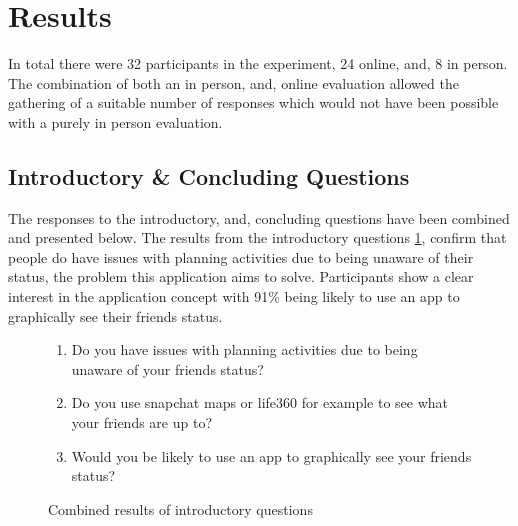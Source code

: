 \section{Results}
In total there were 32 participants in the experiment, 24 online, and, 8 in person. The combination of both an in person, and, online evaluation allowed the gathering of a suitable number of responses which would not have been possible with a purely in person evaluation.

\subsection{Introductory \& Concluding Questions}
The responses to the introductory, and, concluding questions have been combined and presented below. The results from the introductory questions \ref{fig:introAns}, confirm that people do have issues with planning activities due to being unaware of their status, the problem this application aims to solve. Participants show a clear interest in the application concept with 91\% being likely to use an app to graphically see their friends status. 

\begin{figure}[H]

\begin{enumerate}
    \item Do you have issues with planning activities due to being unaware of your friends status?
    \item Do you use snapchat maps or life360 for example to see what your friends are up to?
    \item Would you be likely to use an app to graphically see your friends status?
\end{enumerate}

\caption{Combined results of introductory questions}
\label{fig:introAns}
\end{figure}
\FloatBarrier

